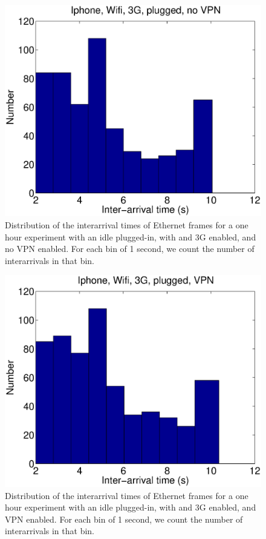 \begin{figure}
\centering
        \includegraphics[width=0.8\linewidth]{../../code/pushNotification/Fig/bw_iphone_wifi_3g_plug_novpn_interTs.eps}
  \caption{Distribution of the interarrival times of Ethernet frames
    for a one hour experiment with an idle \iphone{} plugged-in, with \wifi{} and 3G
    enabled, and no VPN enabled. For each bin of 1 second, we count
    the number of interarrivals in that bin.}
  \label{fig:push_w3p_interTs}
\end{figure}


\begin{figure}
\centering
        \includegraphics[width=0.8\linewidth]{../../code/pushNotification/Fig/bw_iphone_wifi_3g_plug_vpn_interTs.eps}
  \caption{Distribution of the interarrival times of Ethernet frames
    for a one hour experiment with an idle \iphone{} plugged-in, with \wifi{} and 3G
    enabled, and VPN enabled. For each bin of 1 second, we count
    the number of interarrivals in that bin.}
  \label{fig:push_w3pv_interTs}
\end{figure}

